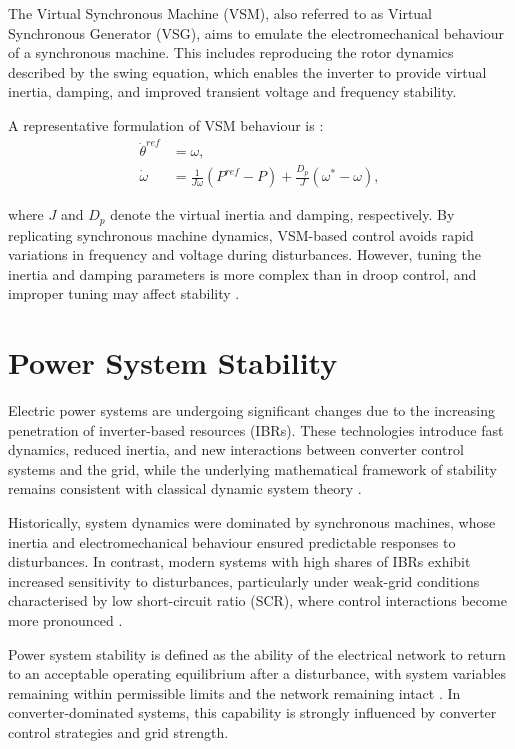 The Virtual Synchronous Machine (VSM), also referred to as Virtual Synchronous Generator (VSG), aims to emulate the electromechanical behaviour of a synchronous machine.\cite{9479398} This includes reproducing the rotor dynamics described by the swing equation, which enables the inverter to provide virtual inertia, damping, and improved transient voltage and frequency stability. \cite{10755449}

A representative formulation of VSM behaviour is \cite{10949993}:
\begin{align}
\dot{\theta}^{ref} &= \omega, \\
\dot{\omega} &= \frac{1}{J \omega} (P^{ref} - P) + \frac{D_p}{J} (\omega^{*} - \omega),
\end{align}

where \(J\) and \(D_p\) denote the virtual inertia and damping, respectively. By replicating synchronous machine dynamics, VSM-based control avoids rapid variations in frequency and voltage during disturbances. However, tuning the inertia and damping parameters is more complex than in droop control, and improper tuning may affect stability \cite{10755449}.



\section{Power System Stability}

Electric power systems are undergoing significant changes due to the increasing penetration of inverter-based resources (IBRs). These technologies introduce fast dynamics, reduced inertia, and new interactions between converter control systems and the grid, while the underlying mathematical framework of stability remains consistent with classical dynamic system theory \cite{1318675, 9286772}.

Historically, system dynamics were dominated by synchronous machines, whose inertia and electromechanical behaviour ensured predictable responses to disturbances. In contrast, modern systems with high shares of IBRs exhibit increased sensitivity to disturbances, particularly under weak-grid conditions characterised by low short-circuit ratio (SCR), where control interactions become more pronounced \cite{9286772}.

Power system stability is defined as the ability of the electrical network to return to an acceptable operating equilibrium after a disturbance, with system variables remaining within permissible limits and the network remaining intact \cite{1318675}. In converter-dominated systems, this capability is strongly influenced by converter control strategies and grid strength.

